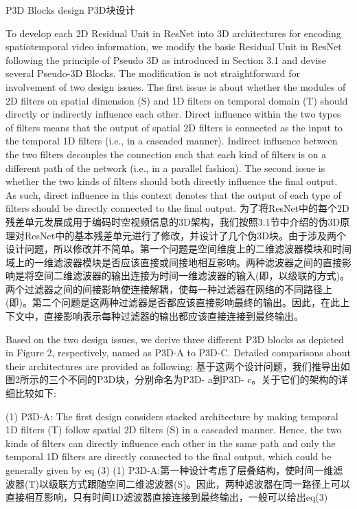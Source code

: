 P3D Blocks design
P3D块设计

To develop each 2D Residual Unit in ResNet into 3D architectures for encoding spatiotemporal video information, we modify the basic Residual Unit in ResNet following the principle of Pseudo 3D as introduced in Section 3.1 and devise several Pseudo-3D Blocks. The modification is not straightforward for involvement of two design issues. The first issue is about whether the modules of 2D filters on spatial dimension (S) and 1D filters on temporal domain (T) should directly or indirectly influence each other. Direct influence within the two types of filters means that the output of spatial 2D filters is connected as the input to the temporal 1D filters (i.e., in a cascaded manner). Indirect influence between the two filters decouples the connection such that each kind of filters is on a different path of the network (i.e., in a parallel fashion). The second issue is whether the two kinds of filters should both directly influence the final output. As such, direct influence in this context denotes that the output of each type of filters should be directly connected to the final output.
为了将ResNet中的每个2D残差单元发展成用于编码时空视频信息的3D架构，我们按照3.1节中介绍的伪3D原理对ResNet中的基本残差单元进行了修改，并设计了几个伪3D块。由于涉及两个设计问题，所以修改并不简单。第一个问题是空间维度上的二维滤波器模块和时间域上的一维滤波器模块是否应该直接或间接地相互影响。两种滤波器之间的直接影响是将空间二维滤波器的输出连接为时间一维滤波器的输入(即，以级联的方式)。两个过滤器之间的间接影响使连接解耦，使每一种过滤器在网络的不同路径上(即)。第二个问题是这两种过滤器是否都应该直接影响最终的输出。因此，在此上下文中，直接影响表示每种过滤器的输出都应该直接连接到最终输出。

Based on the two design issues, we derive three different P3D blocks as depicted in Figure 2, respectively, named as P3D-A to P3D-C. Detailed comparisons about their architectures are provided as following:
基于这两个设计问题，我们推导出如图2所示的三个不同的P3D块，分别命名为P3D- a到P3D- c。关于它们的架构的详细比较如下:

(1) P3D-A: The first design considers stacked architecture by making temporal 1D filters (T) follow spatial 2D filters (S) in a cascaded manner. Hence, the two kinds of filters can directly influence each other in the same path and only the temporal 1D filters are directly connected to the final output, which could be generally given by
eq (3)
(1) P3D-A:第一种设计考虑了层叠结构，使时间一维滤波器(T)以级联方式跟随空间二维滤波器(S)。因此，两种滤波器在同一路径上可以直接相互影响，只有时间1D滤波器直接连接到最终输出，一般可以给出eq(3)

